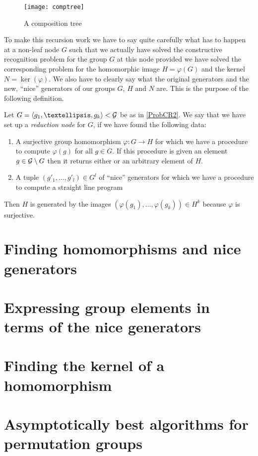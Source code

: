 \begin{figure}
\begin{center}
\texttt{[image: comptree]}
\end{center}
\caption{A composition tree}
\label{comptreefig}
\end{figure}

To make this recursion work we have to say quite carefully what has to
happen at a non-leaf node $G$ such that we actually have solved the
constructive recognition problem for the group $G$ at this node provided
we have solved the corresponding problem for the homomorphic image
$H=\varphi(G)$ and the kernel $N = \ker(\varphi)$. We also have to
clearly say what the original generators and the new, ``nice'' generators
of our groups $G$, $H$ and $N$ are. This is the purpose of the following
definition.

\begin{Def}
\label{reducnode}
Let $G = \left< g_1, \ldots, g_k \right> < \GG$ be as in \ref{ProbCR2}.
We say that we have set up a \emph{reduction node} for $G$, if we have
found the following data:
\begin{enumerate}
\item A surjective group homomorphism $\varphi : G \to H$ for which we
have a procedure to compute $\varphi(g)$ for all $g \in G$. If this
procedure is given an element $g \in \mathcal{G} \setminus G$ then it returns
either {\fail} or an arbitrary element of $H$.
\item A tuple $(g'_1,\ldots,g'_l) \in G^l$ of ``nice'' generators for which
we have a procedure to compute a straight line program 
\end{enumerate}

\end{Def}

Then 
$H$ is generated by the images $(\varphi(g_1),\ldots,\varphi(g_k)) \in
H^k$ because $\varphi$ is surjective.
\section{Finding homomorphisms and nice generators}
\label{findhom}

\section{Expressing group elements in terms of the nice generators}
\label{expressslp}

\section{Finding the kernel of a homomorphism}
\label{findkernel}

\section{Asymptotically best algorithms for permutation groups}
\label{permgrps}

